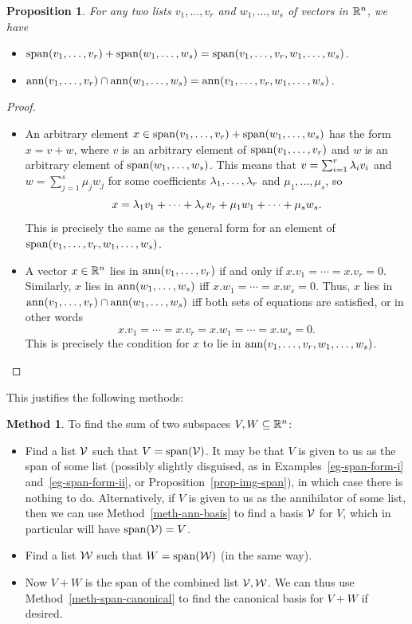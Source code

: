 \documentclass[reqno]{amsart}
\newtheorem{proposition}[theorem]{Proposition}
\theoremstyle{definition}
\newtheorem{method}[theorem]{Method}
\begin{document}
\begin{proposition}\label{prop-sum-meet-concat}
 For any two lists $v_1,\dotsc,v_r$ and $w_1,\dotsc,w_s$ of vectors in
 ${\mathbb{R}}^n$, we have
 \begin{itemize}
  \item[(a)] $\operatorname{span}(v_1,\dotsc,v_r)+\operatorname{span}(w_1,\dotsc,w_s)=
              \operatorname{span}(v_1,\dotsc,v_r,w_1,\dotsc,w_s)$.
  \item[(b)] $\operatorname{ann}(v_1,\dotsc,v_r)\cap\operatorname{ann}(w_1,\dotsc,w_s)=
              \operatorname{ann}(v_1,\dotsc,v_r,w_1,\dotsc,w_s)$.
 \end{itemize}
\end{proposition}
\begin{proof}
 \begin{itemize}
  \item[(a)] An arbitrary element
   $x\in\operatorname{span}(v_1,\dotsc,v_r)+\operatorname{span}(w_1,\dotsc,w_s)$ has the form
   $x=v+w$, where $v$ is an arbitrary element of
   $\operatorname{span}(v_1,\dotsc,v_r)$ and $w$ is an arbitrary element of
   $\operatorname{span}(w_1,\dotsc,w_s)$.  This means that $v=\sum_{i=1}^r\lambda_iv_i$
   and $w=\sum_{j=1}^s\mu_jw_j$ for some coefficients
   $\lambda_1,\dotsc,\lambda_r$ and $\mu_1,\dotsc,\mu_s$, so
   \[ x = \lambda_1v_1+\dotsb+\lambda_rv_r + \mu_1w_1+\dotsb+\mu_sw_s. \]
   This is precisely the same as the general form for an element of
   $\operatorname{span}(v_1,\dotsc,v_r,w_1,\dotsc,w_s)$.
  \item[(b)] A vector $x\in{\mathbb{R}}^n$ lies in $\operatorname{ann}(v_1,\dotsc,v_r)$ if and
   only if $x.v_1=\dotsb=x.v_r=0$.  Similarly, $x$ lies in
   $\operatorname{ann}(w_1,\dotsc,w_s)$ iff $x.w_1=\dotsb=x.w_s=0$.  Thus, $x$ lies in
   $\operatorname{ann}(v_1,\dotsc,v_r)\cap\operatorname{ann}(w_1,\dotsc,w_s)$ iff both sets of
   equations are satisfied, or in other words
   \[ x.v_1=\dotsb=x.v_r=x.w_1=\dotsb=x.w_s=0. \]
   This is precisely the condition for $x$ to lie in
   $\operatorname{ann}(v_1,\dotsc,v_r,w_1,\dotsc,w_s)$.
   \qedhere
 \end{itemize}
\end{proof}

This justifies the following methods:
\begin{method}\label{meth-find-sum}
 To find the sum of two subspaces $V,W\subseteq{\mathbb{R}}^n$:
 \begin{itemize}
  \item[(a)] Find a list $\mathcal{V}$ such that $V=\operatorname{span}(\mathcal{V})$.  It may be
   that $V$ is given to us as the span of some list (possibly slightly
   disguised, as in Examples~\ref{eg-span-form-i}
   and~\ref{eg-span-form-ii}, or Proposition~\ref{prop-img-span}), in
   which case there is nothing to do.  Alternatively, if $V$ is given
   to us as the annihilator of some list, then we can use
   Method~\ref{meth-ann-basis} to find a basis $\mathcal{V}$ for $V$, which in
   particular will have $\operatorname{span}(\mathcal{V})=V$.
  \item[(b)] Find a list $\mathcal{W}$ such that $W=\operatorname{span}(\mathcal{W})$ (in the same
   way).
  \item[(c)] Now $V+W$ is the span of the combined list $\mathcal{V},\mathcal{W}$.  We
   can thus use Method~\ref{meth-span-canonical} to find the canonical
   basis for $V+W$ if desired.
 \end{itemize}
\end{method}
\end{document}
